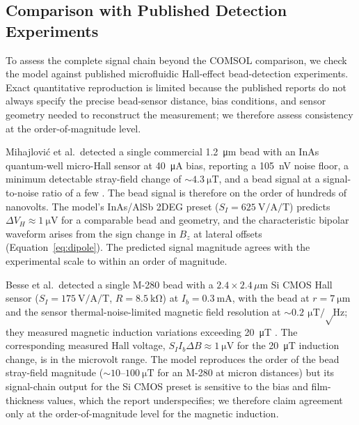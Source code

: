 \documentclass[biosensors,article,submit,pdftex,moreauthors]{Definitions/mdpi}
\begin{document}
\subsection{Comparison with Published Detection Experiments}
\label{sec:expvalidation}

To assess the complete signal chain beyond the COMSOL comparison, we check the model
against published microfluidic Hall-effect bead-detection experiments. Exact
quantitative reproduction is limited because the published reports do not always
specify the precise bead-sensor distance, bias conditions, and sensor geometry needed
to reconstruct the measurement; we therefore assess consistency at the order-of-magnitude
level.

Mihajlovi\'{c} et al.\ detected a single commercial \SI{1.2}{\micro\meter} bead with
an InAs quantum-well micro-Hall sensor at \SI{40}{\micro\ampere} bias, reporting a
\SI{105}{\nano\volt} noise floor, a minimum detectable stray-field change of
${\sim}\SI{4.3}{\micro\tesla}$, and a bead signal at a signal-to-noise ratio of a few
\cite{mihajlovic2005}. The bead signal is therefore on the order of hundreds of
nanovolts. The model's InAs/AlSb 2DEG preset
($S_I = \SI{625}{\volt\per\ampere\per\tesla}$) predicts $\Delta V_H \approx
\SI{1}{\micro\volt}$ for a comparable bead and geometry, and the characteristic
bipolar waveform arises from the sign change in $B_z$ at lateral offsets
(Equation~\eqref{eq:dipole}). The predicted signal magnitude agrees with the
experimental scale to within an order of magnitude.

Besse et al.\ detected a single M-280 bead with a $2.4 \times 2.4$\,$\mu$m Si CMOS
Hall sensor ($S_I = \SI{175}{\volt\per\ampere\per\tesla}$, $R = \SI{8.5}{\kilo\ohm}$)
at $I_b = \SI{0.3}{\milli\ampere}$, with the bead at $r = \SI{7}{\micro\meter}$ and
the sensor thermal-noise-limited magnetic field resolution at
${\sim}\SI{0.2}{\micro\tesla\per\sqrt\hertz}$; they measured magnetic induction
variations exceeding \SI{20}{\micro\tesla} \cite{besse2002}. The corresponding
measured Hall voltage, $S_I I_b \Delta B \approx \SI{1}{\micro\volt}$ for the
\SI{20}{\micro\tesla} induction change, is in the microvolt range. The model
reproduces the order of the bead stray-field magnitude
(${\sim}10$--$\SI{100}{\micro\tesla}$ for an M-280 at micron distances) but its
signal-chain output for the Si CMOS preset is sensitive to the bias and film-thickness
values, which the report underspecifies; we therefore claim agreement only at the
order-of-magnitude level for the magnetic induction.
\end{document}
